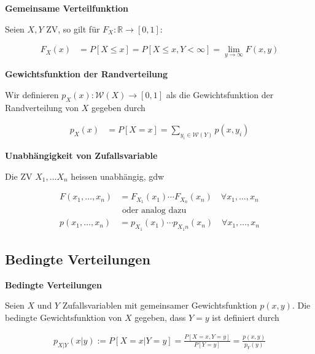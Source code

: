 \documentclass[25pt]{sciposter}
\newcommand{\R}{\mathbb{R}}
\newcommand{\W}{\mathcal{W}}
\newenvironment{method}[1]{\begin{mdframed}[backgroundcolor=blue!10,innertopmargin=15pt, innerbottommargin=15pt,nobreak=true]
		\textbf{#1 }
	}
	{ 
	\end{mdframed}
}
\begin{document}
\begin{multicols}{3}
\begin{method}{Gemeinsame Verteilfunktion}
	Seien $X,Y$ ZV, so gilt für $F_X : \R \to [0,1]$:
	
	\begin{align*}
		F_X(x) &= P[X \leq x] = P[X \leq x , Y < \infty] = \lim\limits_{y\to\infty} F(x,y)
	\end{align*}
\end{method}

\begin{method}{Gewichtsfunktion der Randverteilung}
	Wir definieren $p_X(x) : \W(X) \to [0,1]$ als die Gewichtsfunktion der Randverteilung von $X$ gegeben durch 

	\begin{align*}
p_X(x) &= P[X=x] = \sum_{y_i\in \W(Y)} p(x,y_i)
	\end{align*}

\end{method}


\begin{method}{Unabhängigkeit von Zufallsvariable}
	Die ZV $X_1, \ldots X_n$ heissen unabhängig, gdw 
	
	\begin{align*}
		F(x_1, \ldots, x_n) &= F_{X_1}(x_1) \cdots F_{X_n}(x_n) \quad \forall x_1,\ldots,x_n\\
		&\text{ oder analog dazu}\\
		p(x_1,\ldots, x_n) &= p_{X_1}(x_1)\cdots p_{X_1n}(x_n) \quad \forall x_1,\ldots,x_n
	\end{align*}

	
	
	
\end{method}



\subsection*{Bedingte Verteilungen}

\begin{method}{Bedingte Verteilungen}
	Seien $X$ und $Y$ Zufallsvariablen mit gemeinsamer Gewichtsfunktion $p(x,y)$. Die bedingte Gewichtsfunktion von $X$ gegeben, dass $Y = y$ ist definiert durch
	
	\begin{align*}
		p_{X|Y} (x|y) := P[X=x | Y=y] = \frac{P[X=x, Y=y]}{P[Y=y]} = \frac{p(x,y)}{p_Y(y)}
	\end{align*}
\end{method}



\end{multicols}
\end{document}
